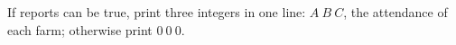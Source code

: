 If reports can be true, print three integers in one line: $A\ B\ C$, the attendance of each farm;
otherwise print $0\ 0\ 0$.
